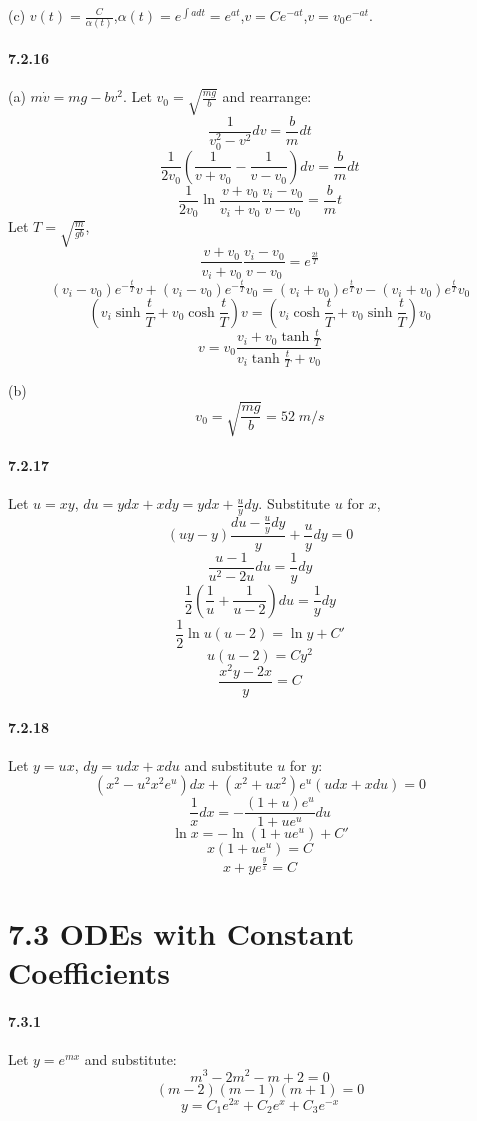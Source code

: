 \documentclass[a4paper]{article}
\begin{document}
(c) $v(t)=\frac{C}{\alpha(t)}$,\quad $\alpha(t)=e^{\int adt}=e^{at}$,\quad $v=Ce^{-at}$,\quad $v=v_0e^{-at}$.

\paragraph{7.2.16}
(a)
$m\dot{v}=mg-bv^2$. 
Let $v_0=\sqrt{\frac{mg}{b}}$ and rearrange:
\[
\frac{1}{v_0^2-v^2}dv=\frac{b}{m}dt
\]
\[
\frac{1}{2v_0}(\frac{1}{v+v_0}-\frac{1}{v-v_0})dv=\frac{b}{m}dt
\]
\[
\frac{1}{2v_0}\ln\frac{v+v_0}{v_i+v_0}\frac{v_i-v_0}{v-v_0}=\frac{b}{m}t
\]
Let $T=\sqrt{\frac{m}{gb}}$,
\[
\frac{v+v_0}{v_i+v_0}\frac{v_i-v_0}{v-v_0}=e^{\frac{2t}{T}}
\]
\[
(v_i-v_0)e^{-\frac{t}{T}}v+(v_i-v_0)e^{-\frac{t}{T}}v_0=(v_i+v_0)e^{\frac{t}{T}}v-(v_i+v_0)e^{\frac{t}{T}}v_0
\]
\[
(v_i\sinh{\frac{t}{T}}+v_0\cosh{\frac{t}{T}})v=
(v_i\cosh{\frac{t}{T}}+v_0\sinh{\frac{t}{T}})v_0
\]
\[
v=v_0\frac{v_i+v_0\tanh{\frac{t}{T}}}{v_i\tanh{\frac{t}{T}}+v_0}
\]

(b) 
\[
v_0=\sqrt{\frac{mg}{b}}=52\;m/s
\]

\paragraph{7.2.17}
Let $u=xy$,\; $du=ydx+xdy=ydx+\frac{u}{y}dy$. Substitute $u$ for $x$,
\[
(uy-y)\frac{du-\frac{u}{y}dy}{y}+\frac{u}{y}dy=0
\]
\[
\frac{u-1}{u^2-2u}du=\frac{1}{y}dy
\]
\[
\frac{1}{2}(\frac{1}{u}+\frac{1}{u-2})du=\frac{1}{y}dy
\]
\[
\frac{1}{2}\ln u(u-2)=\ln y+C'
\]
\[
u(u-2)=Cy^2
\]
\[
\frac{x^2y-2x}{y}=C
\]

\paragraph{7.2.18}
Let $y=ux$, $dy=udx+xdu$ and substitute $u$ for $y$:
\[
(x^2-u^2x^2e^u)dx+(x^2+ux^2)e^u(udx+xdu)=0
\]
\[
\frac{1}{x}dx=-\frac{(1+u)e^u}{1+ue^u}du
\]
\[
\ln x=-\ln(1+ue^u)+C'
\]
\[
x(1+ue^u)=C
\]
\[
x+ye^\frac{y}{x}=C
\]

\section*{7.3 ODEs with Constant Coefficients}

\paragraph{7.3.1}
Let $y=e^{mx}$ and substitute:
\[
m^3-2m^2-m+2=0
\]
\[
(m-2)(m-1)(m+1)=0
\]
\[
y=C_1e^{2x}+C_2e^x+C_3e^{-x}
\]
\end{document}
